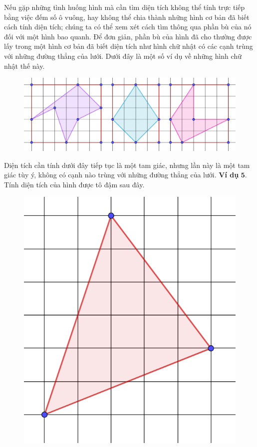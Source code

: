 \begin{multicols}{2}
\begin{figure}[H]
		\vspace*{-10pt}
	\end{figure}
	Nếu gặp những tình huống hình mà cần tìm diện tích không thể tính trực tiếp bằng việc đếm số ô vuông, hay không thể chia thành những hình cơ bản đã biết cách tính diện tích; chúng ta có thể xem xét cách tìm thông qua phần bù của nó đối với một hình bao quanh. Để đơn giản, phần bù của hình đã cho thường được lấy trong một hình cơ bản đã biết diện tích như hình chữ nhật có các cạnh trùng với những đường thẳng của lưới. Dưới đây là một số ví dụ về những hình chữ nhật thế này.
	\begin{figure}[H]
		\centering
		\vspace*{5pt}
		\captionsetup{labelformat= empty, justification=centering}
		\includegraphics[width=1\linewidth]{10}
		\vspace*{-15pt}
	\end{figure}
	Diện tích cần tính dưới đây tiếp tục là một tam giác, nhưng lần này là một tam giác tùy ý, không có cạnh nào trùng với những đường thẳng của lưới. 
	\vskip 0.1cm
	\textbf{\color{toancuabi}Ví dụ} $\pmb{5.}$ Tính diện tích của hình được tô đậm sau đây.
	\begin{figure}[H]
		\centering
		\vspace*{-5pt}
		\captionsetup{labelformat= empty, justification=centering}
		\includegraphics[width=0.5\linewidth]{11}

\end{figure}
\end{multicols}
